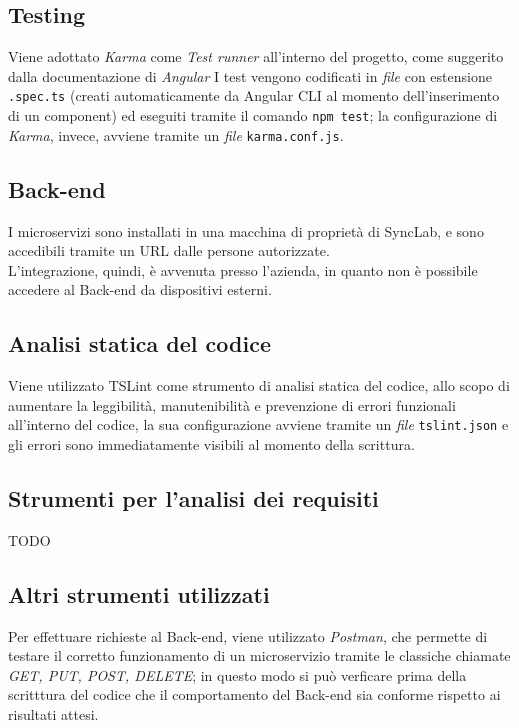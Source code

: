 \subsection{Testing}
Viene adottato \textit{Karma} come \textit{Test runner} all'interno del progetto, come suggerito dalla documentazione di \textit{Angular}
I test vengono codificati in \textit{file} con estensione \texttt{.spec.ts} (creati automaticamente da Angular CLI al momento dell'inserimento di un component) ed eseguiti tramite il comando \texttt{npm test}; la configurazione di \textit{Karma}, invece, avviene tramite un \textit{file} \texttt{karma.conf.js}.

\subsection{Back-end}
I microservizi sono installati in una macchina di proprietà di SyncLab, e sono accedibili tramite un URL dalle persone autorizzate.\\
L'integrazione, quindi, è avvenuta presso l'azienda, in quanto non è possibile accedere al \gls{Back-end} da dispositivi esterni.

\subsection{Analisi statica del codice} \label{tslint}
Viene utilizzato TSLint come strumento di analisi statica del codice, allo scopo di aumentare la leggibilità, manutenibilità e prevenzione di errori funzionali all'interno del codice, la sua configurazione avviene tramite un \textit{file} \texttt{tslint.json} e gli errori sono immediatamente visibili al momento della scrittura.

\subsection{Strumenti per l'analisi dei requisiti}
TODO

\subsection{Altri strumenti utilizzati}
Per effettuare richieste al \gls{Back-end}, viene utilizzato \textit{Postman}, che permette di testare il corretto funzionamento di un microservizio tramite le classiche chiamate \textit{GET, PUT, POST, DELETE}; in questo modo si può verficare prima della scritttura del codice che il comportamento del \gls{Back-end} sia conforme rispetto ai risultati attesi.


